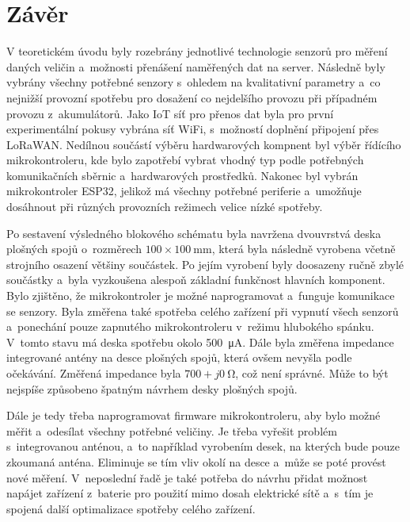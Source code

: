 \chapter*{Závěr}
{}

V teoretickém úvodu byly rozebrány jednotlivé technologie senzorů pro měření daných veličin a~možnosti přenášení naměřených dat na server. Následně byly vybrány všechny potřebné senzory s~ohledem na kvalitativní parametry a~co nejnižší provozní spotřebu pro dosažení co nejdelšího provozu při případném provozu z~akumulátorů. Jako IoT síť pro přenos dat byla pro první experimentální pokusy vybrána síť WiFi, s~možností doplnění připojení přes LoRaWAN. Nedílnou součástí výběru hardwarových kompnent byl výběr řídícího mikrokontroleru, kde bylo zapotřebí vybrat vhodný typ podle potřebných komunikačních sběrnic a~hardwarových prostředků. Nakonec byl vybrán mikrokontroler ESP32, jelikož má všechny potřebné periferie a~umožňuje dosáhnout při různých provozních režimech velice nízké spotřeby.

Po sestavení výsledného blokového schématu byla navržena dvouvrstvá deska plošných spojů o~rozměrech $100\times\SI{100}{\milli\metre}$, která byla následně vyrobena včetně strojního osazení většiny součástek. Po jejím vyrobení byly doosazeny ručně zbylé součástky a~byla vyzkoušena alespoň základní funkčnost hlavních komponent. Bylo zjištěno, že mikrokontroler je možné naprogramovat a~funguje komunikace se senzory. Byla změřena také spotřeba celého zařízení při vypnutí všech senzorů a~ponechání pouze zapnutého mikrokontroleru v~režimu hlubokého spánku. V~tomto stavu má deska spotřebu okolo \SI{500}{\micro\ampere}. Dále byla změřena impedance integrované antény na desce plošných spojů, která ovšem nevyšla podle očekávání. Změřená impedance byla $700+j\SI{0}{\ohm}$, což není správné. Může to být nejspíše způsobeno špatným návrhem desky plošných spojů.

Dále je tedy třeba naprogramovat firmware mikrokontroleru, aby bylo možné měřit a~odesílat všechny potřebné veličiny. Je třeba vyřešit problém s~integrovanou anténou, a~to například vyrobením desek, na kterých bude pouze zkoumaná anténa. Eliminuje se tím vliv okolí na desce a~může se poté provést nové měření. V~neposlední řadě je také potřeba do návrhu přidat možnost napájet zařízení z~baterie pro použití mimo dosah elektrické sítě a~s~tím je spojená další optimalizace spotřeby celého zařízení.